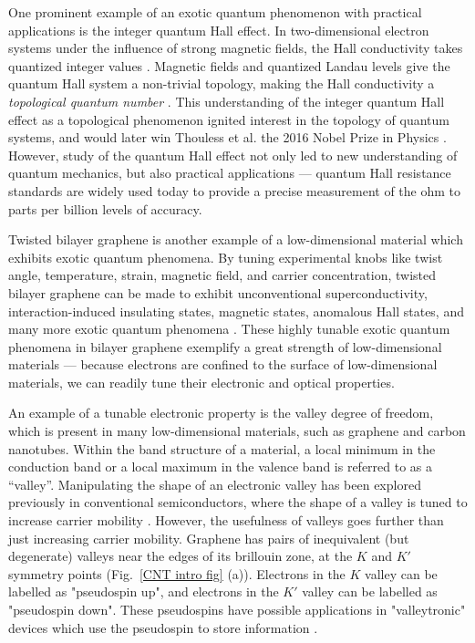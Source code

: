 \documentclass[double,12pt,1in,seploa]{beavtex}
\begin{document}
One prominent example of an exotic quantum phenomenon with practical applications is the integer quantum Hall effect. In two-dimensional electron systems under the influence of strong magnetic fields, the Hall conductivity takes quantized integer values \cite{wakabayashi_hall_1978}. Magnetic fields and quantized Landau levels give the quantum Hall system a non-trivial topology, making the Hall conductivity a \textit{topological quantum number} \cite{thouless_quantized_1982}. This understanding of the integer quantum Hall effect as a topological phenomenon ignited interest in the topology of quantum systems, and would later win Thouless et al. the 2016 Nobel Prize in Physics \cite{noauthor_nobel_nodate}. However, study of the quantum Hall effect not only led to new understanding of quantum mechanics, but also practical applications — quantum Hall resistance standards are widely used today to provide a precise measurement of the ohm to parts per billion levels of accuracy. 

Twisted bilayer graphene is another example of a low-dimensional material which exhibits exotic quantum phenomena. By tuning experimental knobs like twist angle, temperature, strain, magnetic field, and carrier concentration, twisted bilayer graphene can be made to exhibit unconventional superconductivity, interaction-induced insulating states, magnetic states, anomalous Hall states, and many more exotic quantum phenomena \cite{andrei_graphene_2020}. These highly tunable exotic quantum phenomena in bilayer graphene exemplify a great strength of low-dimensional materials — because electrons are confined to the surface of low-dimensional materials, we can readily tune their electronic and optical properties.

An example of a tunable electronic property is the valley degree of freedom, which is present in many low-dimensional materials, such as graphene and carbon nanotubes. Within the band structure of a material, a local minimum in the conduction band or a local maximum in the valence band is referred to as a “valley”. Manipulating the shape of an electronic valley has been explored previously in conventional semiconductors, where the shape of a valley is tuned to increase carrier mobility \cite{thompson_90-nm_2004}. However, the usefulness of valleys goes further than just increasing carrier mobility. Graphene has pairs of inequivalent (but degenerate) valleys near the edges of its brillouin zone, at the $K$ and $K'$ symmetry points (Fig.\ \ref{CNT intro fig} (a)). Electrons in the $K$ valley can be labelled as "pseudospin up", and electrons in the $K'$ valley can be labelled as "pseudospin down". These pseudospins have possible applications in "valleytronic" devices which use the pseudospin to store information \cite{schaibley_valleytronics_2016}. 
\end{document}
